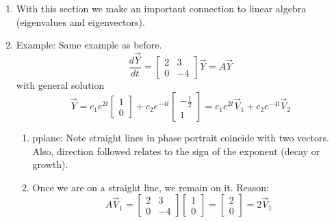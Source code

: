\documentclass{article}
\begin{document}
\begin{enumerate}

\item With this section we make an important connection to linear algebra (eigenvalues and eigenvectors).

\item Example: Same example as before.
\[
\frac{d\vec{Y}}{dt} = 
\begin{bmatrix}
2 & 3 \\
0 & -4
\end{bmatrix} \vec{Y} = A \vec{Y}
\]
with general solution
\[
\vec{Y} = 
c_1 e^{2t} 
\begin{bmatrix}
1 \\
0
\end{bmatrix}
+
c_2 e^{-4t} 
\begin{bmatrix}
-\frac{1}{2} \\
1
\end{bmatrix}
= c_1 e^{2t}\vec{V}_1 + c_2e^{-4t}\vec{V}_2\]
\begin{enumerate}
\item pplane: Note straight lines in phase portrait coincide with two vectors. Also, direction followed relates to the sign of the exponent (decay or growth).
\item Once we are on a straight line, we remain on it. Reason:
\[
A\vec{V}_1 = 
\begin{bmatrix}
2 & 3 \\
0 & -4
\end{bmatrix} 
\begin{bmatrix}
1 \\ 0
\end{bmatrix} 
=
\begin{bmatrix}
2 \\ 0
\end{bmatrix}
= 2 \vec{V}_1
\]
\end{enumerate}


\end{enumerate}
\end{document}
